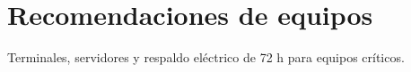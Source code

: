\chapter{Recomendaciones de equipos}
Terminales, servidores y respaldo eléctrico de 72 h para equipos críticos.

